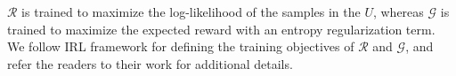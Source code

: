 \documentclass[11pt]{article}
\begin{document}

$\mathcal{R}$ is trained to maximize the log-likelihood of the samples in the $U$, whereas $\mathcal{G}$ is trained to maximize the expected reward with an entropy regularization term. We follow IRL framework for defining the training objectives of $\mathcal{R}$ and $\mathcal{G}$, and refer the readers to their work for additional details.







\end{document}
